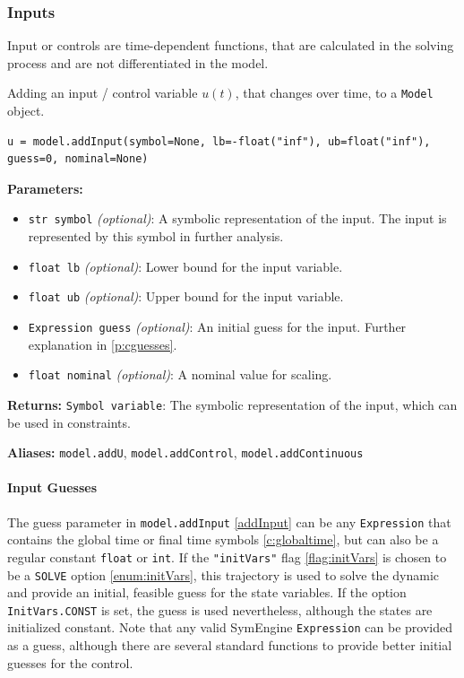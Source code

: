 \documentclass[12pt]{article}
\begin{document}
\subsubsection{Inputs}

Input or controls are time-dependent functions, that are calculated in the
solving process and are not differentiated in the model.

\begin{mdframed}[backgroundcolor=gray!10, roundcorner=10pt, linewidth=1pt]

	Adding an input / control variable $u(t)$, that changes over time, to a
	\texttt{Model} object.

	\begin{lstlisting}
u = model.addInput(symbol=None, lb=-float("inf"), ub=float("inf"), guess=0, nominal=None)
	\end{lstlisting}
	\label{addInput}
	\textbf{Parameters:}
	\begin{itemize}
		\item \texttt{str symbol} \emph{(optional)}: A symbolic
		      representation of the input. The input is
		      represented by this symbol in
		      further analysis.
		\item \texttt{float lb} \emph{(optional)}: Lower bound for the
		      input variable.
		\item \texttt{float ub} \emph{(optional)}: Upper bound for the
		      input variable.
		\item \texttt{Expression guess} \emph{(optional)}: An initial
		      guess for the input. Further explanation in
		      \eqref{p:cguesses}.
		\item \texttt{float nominal} \emph{(optional)}: A nominal value
		      for scaling.
	\end{itemize}

	\textbf{Returns:}
	\texttt{Symbol variable}: The symbolic representation of the input,
	which can be used in constraints.

	\textbf{Aliases:}  \texttt{model.addU}, \texttt{model.addControl},
	\texttt{model.addContinuous}
\end{mdframed}

\paragraph{Input Guesses}
\label{p:cguesses}
The guess parameter in \texttt{model.addInput} \eqref{addInput} can be
any \texttt{Expression} that contains the global time or final time symbols
\eqref{c:globaltime}, but can also be a regular constant \texttt{float} or
\texttt{int}. If the \texttt{"initVars"} flag \eqref{flag:initVars} is chosen to be a  
\texttt{SOLVE} option \eqref{enum:initVars}, this trajectory is used to
solve the dynamic and provide an initial, feasible guess for the state
variables. If the option \texttt{InitVars.CONST} is set, the guess is used nevertheless, although the states are initialized constant. Note that any valid SymEngine \texttt{Expression} can be provided as
a guess, although there are several standard functions to provide better
initial guesses for the control.
\end{document}
